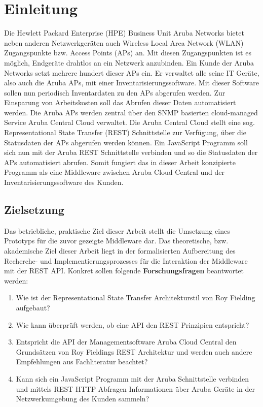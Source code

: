 \chapter{Einleitung}

Die Hewlett Packard Enterprise (HPE) Business Unit Aruba Networks bietet neben anderen Netzwerkgeräten auch Wireless Local Area Network (WLAN) Zugangspunkte bzw. Access Points (APs) an. Mit diesen Zugangspunkten ist es möglich, Endgeräte drahtlos an ein Netzwerk anzubinden. Ein Kunde der Aruba Networks setzt mehrere hundert dieser APs ein. Er verwaltet alle seine IT Geräte, also auch die Aruba APs, mit einer Inventarisierungssoftware. Mit dieser Software sollen nun periodisch Inventardaten zu den APs abgerufen werden. Zur Einsparung von Arbeitskosten soll das Abrufen dieser Daten automatisiert werden. Die Aruba APs werden zentral über den SNMP basierten cloud-managed Service Aruba Central Cloud verwaltet. Die Aruba Central Cloud stellt eine sog. Representational State Transfer (REST) Schnittstelle zur Verfügung, über die Statusdaten der APs abgerufen werden können. Ein JavaScript Programm soll sich nun mit der Aruba REST Schnittstelle verbinden und so die Statusdaten der APs automatisiert abrufen. Somit fungiert das in dieser Arbeit konzipierte Programm als eine Middleware zwischen Aruba Cloud Central und der Inventarisierungssoftware des Kunden. 

\section{Zielsetzung}

Das betriebliche, praktische Ziel dieser Arbeit stellt die Umsetzung eines Prototyps für die zuvor gezeigte Middleware dar. Das theoretische, bzw. akademische Ziel dieser Arbeit liegt in der formalisierten Aufbereitung des Recherche- und Implementierungsprozesses für die Interaktion der Middleware mit der REST API. Konkret sollen folgende \textbf{Forschungsfragen} beantwortet werden:

\begin{enumerate}
    \item Wie ist der Representational State Transfer Architekturstil von Roy Fielding aufgebaut?
    \item Wie kann überprüft werden, ob eine API den REST Prinzipien entspricht?
    \item Entspricht die API der Managementsoftware Aruba Cloud Central den Grundsätzen von Roy Fieldings REST Architektur und werden auch andere Empfehlungen aus Fachliteratur beachtet?
    \item Kann sich ein JavaScript Programm mit der Aruba Schnittstelle verbinden und mittels REST HTTP Abfragen Informationen über Aruba Geräte in der Netzwerkumgebung des Kunden sammeln?
\end{enumerate}

